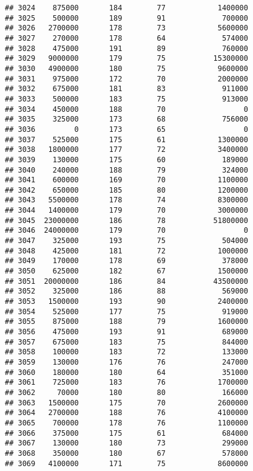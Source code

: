 \documentclass[
]{article}
\begin{document}
\begin{verbatim}
## 3024    875000       184        77            1400000
## 3025    500000       189        91             700000
## 3026   2700000       178        73            5600000
## 3027    270000       178        64             574000
## 3028    475000       191        89             760000
## 3029   9000000       179        75           15300000
## 3030   4900000       180        75            9600000
## 3031    975000       172        70            2000000
## 3032    675000       181        83             911000
## 3033    500000       183        75             913000
## 3034    450000       188        70                  0
## 3035    325000       173        68             756000
## 3036         0       173        65                  0
## 3037    525000       175        61            1300000
## 3038   1800000       177        72            3400000
## 3039    130000       175        60             189000
## 3040    240000       188        79             324000
## 3041    600000       169        70            1100000
## 3042    650000       185        80            1200000
## 3043   5500000       178        74            8300000
## 3044   1400000       179        70            3000000
## 3045  23000000       186        78           51800000
## 3046  24000000       179        70                  0
## 3047    325000       193        75             504000
## 3048    425000       181        72            1000000
## 3049    170000       178        69             378000
## 3050    625000       182        67            1500000
## 3051  20000000       186        84           43500000
## 3052    325000       186        88             569000
## 3053   1500000       193        90            2400000
## 3054    525000       177        75             919000
## 3055    875000       188        79            1600000
## 3056    475000       193        91             689000
## 3057    675000       183        75             844000
## 3058    100000       183        72             133000
## 3059    130000       176        76             247000
## 3060    180000       180        64             351000
## 3061    725000       183        76            1700000
## 3062     70000       180        80             166000
## 3063   1500000       175        70            2600000
## 3064   2700000       188        76            4100000
## 3065    700000       178        76            1100000
## 3066    375000       175        61             684000
## 3067    130000       180        73             299000
## 3068    350000       180        67             578000
## 3069   4100000       171        75            8600000

\end{verbatim}
\end{document}
